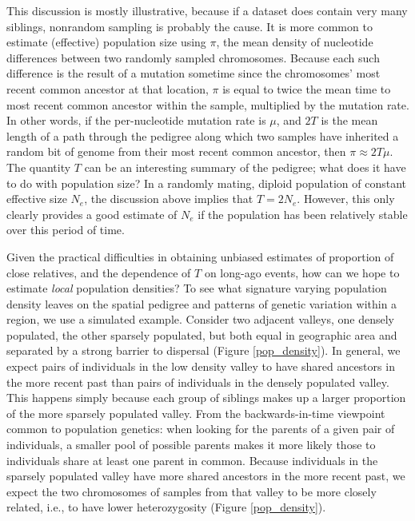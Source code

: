 \documentclass{ar-1col}
\begin{document}
This discussion is mostly illustrative, because
if a dataset does contain very many siblings,
nonrandom sampling is probably the cause.
It is more common to estimate (effective) population size
using $\pi$,
the mean density of nucleotide differences between two randomly sampled chromosomes.
Because each such difference is the result of a mutation
sometime since the chromosomes' most recent common ancestor at that location,
$\pi$ is equal to twice the mean time to most recent common ancestor
within the sample, multiplied by the mutation rate.
In other words, if the per-nucleotide mutation rate is $\mu$,
and $2T$ is the mean length of a path through the pedigree
along which two samples have inherited a random bit of genome
from their most recent common ancestor,
then $\pi \approx 2 T \mu$.
The quantity $T$ can be an interesting summary of the pedigree;
what does it have to do with population size?
In a randomly mating, diploid population of constant effective size $N_e$,
the discussion above implies that $T = 2N_e$.
However, this only clearly provides a good estimate of $N_e$
if the population has been relatively stable over this period of time.

Given the practical difficulties in obtaining unbiased estimates of proportion of close relatives,
and the dependence of $T$ on long-ago events,
how can we hope to estimate \textit{local} population densities?
To see what signature varying population density leaves 
on the spatial pedigree and patterns of genetic variation
within a region,
we use a simulated example.
Consider two adjacent valleys, 
one densely populated, the other sparsely populated, 
but both equal in geographic area 
and separated by a strong barrier to dispersal (Figure \ref{pop_density}).
In general, we expect pairs of individuals in the low density valley 
to have shared ancestors in the more recent past than 
pairs of individuals in the densely populated valley.
This happens simply because 
each group of siblings makes up a larger proportion 
of the more sparsely populated valley.
From the backwards-in-time viewpoint common to population genetics:
when looking for the parents of a given pair of individuals,
a smaller pool of possible parents
makes it more likely those to individuals share at least one parent in common.
Because individuals in the sparsely populated valley have more shared ancestors 
in the more recent past, 
we expect the two chromosomes of samples from that valley to be more closely related,
i.e., to have lower heterozygosity 
(Figure \ref{pop_density}).
\end{document}
